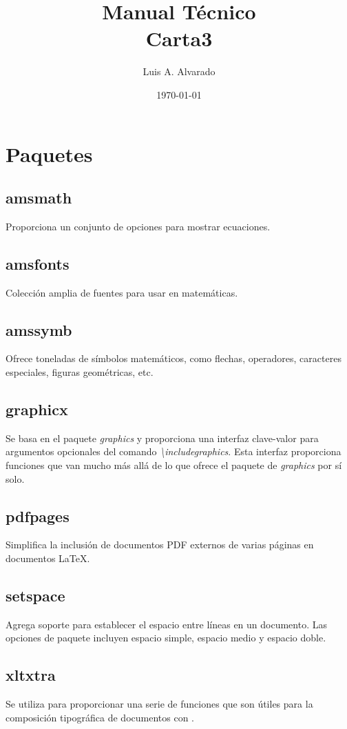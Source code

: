 \documentclass[12pt]{article}
\title{Manual Técnico \\ Carta3}
\author{Luis A. Alvarado}
\date{\today}
\begin{document}
\maketitle{}

\tableofcontents

\clearpage
\newpage

\section{Paquetes}
\subsection{amsmath}
Proporciona un conjunto de opciones para mostrar ecuaciones. \cite{amsmath}
\subsection{amsfonts}
Colección amplia de fuentes para usar en matemáticas. \cite{amsfonts}
\subsection{amssymb}
Ofrece toneladas de símbolos matemáticos, como flechas, operadores, caracteres especiales, figuras geométricas, etc. \cite{amssymb}
\subsection{graphicx}
Se basa en el paquete \textit{graphics} y proporciona una interfaz clave-valor para argumentos opcionales del comando \textit{\textbackslash includegraphics}. Esta interfaz proporciona funciones que van mucho más allá de lo que ofrece el paquete de \textit{graphics} por sí solo. \cite{graphicx}
\subsection{pdfpages}
Simplifica la inclusión de documentos PDF externos de varias páginas en documentos \LaTeX.\cite{pdfpages}
\subsection{setspace}
Agrega soporte para establecer el espacio entre líneas en un documento. Las opciones de paquete incluyen espacio simple, espacio medio y espacio doble. \cite{setspace}
\subsection{xltxtra}
Se utiliza para proporcionar una serie de funciones que son útiles para la composición tipográfica de documentos con \XeLaTeX. \cite{xltxtra}
\end{document}

